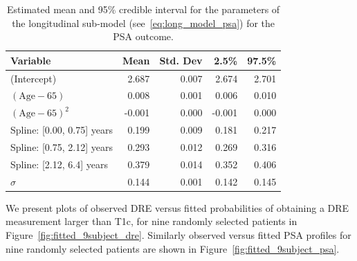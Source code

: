 \begin{table}[!htb]
\begin{center}
\caption{Estimated mean and 95\% credible interval for the parameters of the longitudinal sub-model (see~\ref{eq:long_model_psa}) for the PSA outcome.}
\label{tab:PSA_long}
\begin{tabular}{lrrrr}
\hline
\hline
Variable                         & Mean & Std. Dev & 2.5\%  & 97.5\% \\
\hline
(Intercept) & 2.687 & 0.007 & 2.674 & 2.701 \\
$(\mbox{Age} - 65)$ & 0.008 & 0.001 & 0.006 & 0.010 \\
$(\mbox{Age} - 65)^2$ & -0.001 & 0.000 & -0.001 & 0.000 \\
Spline: [0.00, 0.75] years & 0.199 & 0.009 & 0.181 & 0.217 \\
Spline: [0.75, 2.12] years & 0.293 & 0.012 & 0.269 & 0.316 \\
Spline: [2.12, 6.4] years & 0.379 & 0.014 & 0.352 & 0.406\\
$\sigma$ & 0.144 & 0.001 & 0.142 & 0.145\\
\hline
\end{tabular}
\end{center}
\end{table}

We present plots of observed DRE versus fitted probabilities of obtaining a DRE measurement larger than T1c, for nine randomly selected patients in Figure~\ref{fig:fitted_9subject_dre}. Similarly observed versus fitted PSA profiles for nine randomly selected patients are shown in Figure~\ref{fig:fitted_9subject_psa}. 

